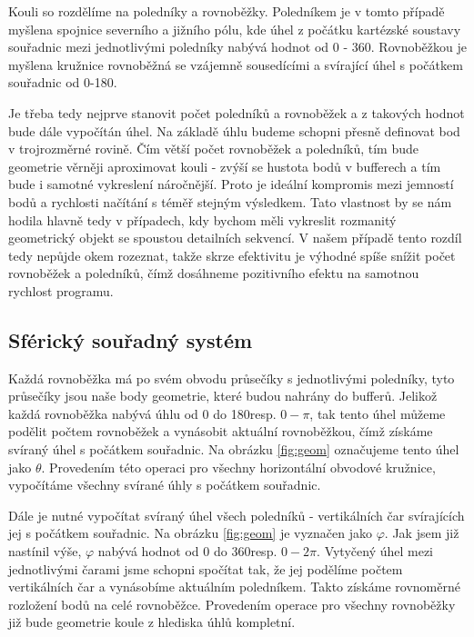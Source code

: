 Kouli so rozdělíme na poledníky a rovnoběžky. Poledníkem je v tomto případě myšlena spojnice severního a jižního pólu, kde úhel z počátku kartézské soustavy souřadnic mezi jednotlivými poledníky nabývá hodnot od 0 - 360\degree. Rovnoběžkou je myšlena kružnice  rovnoběžná se vzájemně sousedícími a svírající úhel s počátkem souřadnic od 0-180\degree. 

Je třeba tedy nejprve stanovit počet poledníků a rovnoběžek a z takových hodnot bude dále vypočítán úhel. Na základě úhlu budeme schopni přesně definovat bod v trojrozměrné rovině. Čím větší počet rovnoběžek a poledníků, tím bude geometrie věrněji aproximovat kouli - zvýší se hustota bodů v bufferech a tím bude i samotné vykreslení náročnější. Proto je ideální kompromis mezi jemností bodů a rychlosti načítání s téměř stejným výsledkem. Tato vlastnost by se nám hodila hlavně tedy v případech, kdy bychom měli vykreslit rozmanitý geometrický objekt se spoustou detailních sekvencí. V našem případě tento rozdíl tedy nepůjde okem rozeznat, takže skrze efektivitu je výhodné spíše snížit počet rovnoběžek a poledníků, čímž dosáhneme pozitivního efektu na samotnou rychlost programu.


\subsection{Sférický souřadný systém}

Každá rovnoběžka má po svém obvodu průsečíky s jednotlivými poledníky, tyto průsečíky jsou naše body geometrie, které budou nahrány do bufferů. Jelikož každá rovnoběžka nabývá úhlu od 0 do 180\degree  resp. $0-\pi$, tak tento úhel můžeme podělit počtem rovnoběžek a vynásobit aktuální rovnoběžkou, čímž získáme svíraný úhel s počátkem souřadnic. Na obrázku \ref{fig:geom} označujeme tento úhel jako $\theta$. Provedením této operaci pro všechny horizontální obvodové kružnice, vypočítáme všechny svírané úhly s počátkem souřadnic. 

Dále je nutné vypočítat svíraný úhel všech poledníků - vertikálních čar svírajících jej s počátkem souřadnic. Na obrázku \ref{fig:geom} je vyznačen jako $\varphi$. Jak jsem již nastínil výše, $\varphi$ nabývá hodnot od 0 do 360\degree resp. $0-2\pi$. Vytyčený úhel mezi jednotlivými čarami jsme schopni spočítat tak, že jej podělíme počtem vertikálních čar a vynásobíme aktuálním poledníkem. Takto získáme rovnoměrné rozložení bodů na celé rovnoběžce. Provedením  operace pro všechny rovnoběžky již bude geometrie koule z hlediska úhlů kompletní.

